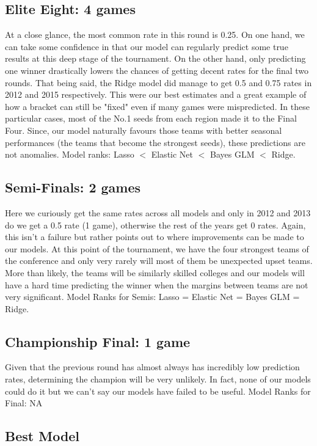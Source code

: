 \documentclass{article} %
\begin{document}
\subsection{Elite Eight: 4 games}

At a close glance, the most common rate in this round is 0.25. On one hand, we can take some confidence in that our model can regularly predict some true results at this deep stage of the tournament. On the other hand, only predicting one winner drastically lowers the chances of getting decent rates for the final two rounds. That being said, the Ridge model did manage to get 0.5 and 0.75 rates in 2012 and 2015 respectively. This were our best estimates and a great example of how a bracket can still be "fixed" even if many games were mispredicted. In these particular cases, most of the No.1 seeds from each region made it to the Final Four. Since, our model naturally favours those teams with better seasonal performances (the teams that become the strongest seeds), these predictions are not anomalies. Model ranks: Lasso  $<$ Elastic Net $<$ Bayes GLM $<$ Ridge.  

\subsection{Semi-Finals: 2 games}

Here we curiously get the same rates across all models and only in 2012 and 2013 do we get a 0.5 rate (1 game), otherwise the rest of the years get 0 rates. Again, this isn't a failure but rather points out to where improvements can be made to our models. At this point of the tournament, we have the four strongest teams of the conference and only very rarely will most of them be unexpected upset teams. More than likely, the teams will be similarly skilled colleges and our models will have a hard time predicting the winner when the margins between teams are not very significant. Model Ranks for Semis: Lasso  = Elastic Net = Bayes GLM = Ridge.  

\subsection{Championship Final: 1 game}
Given that the previous round has almost always has incredibly low prediction rates, determining the champion will be very unlikely. In fact, none of our models could do it but we can't say our models have failed to be useful. Model Ranks for Final: NA

\subsection{Best Model}
\end{document}
